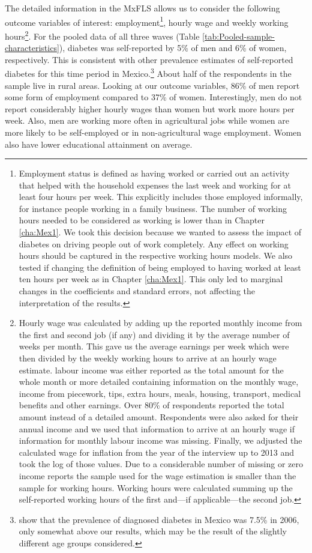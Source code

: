 The detailed information in the \ac{MxFLS} allows us to consider the following outcome variables of interest: employment\footnote{Employment status is defined as having worked or carried out an activity that helped with the household expenses the last week and working for at least four hours per week. This explicitly includes those employed informally, for instance people working in a family business. The number of working hours needed to be considered as working is lower than in Chapter \ref{cha:Mex1}. We took this decision because we wanted to assess the impact of diabetes on driving people out of work completely. Any effect on working hours should be captured in the respective working hours models. We also tested if changing the definition of being employed to having worked at least ten hours per week as in Chapter \ref{cha:Mex1}. This only led to marginal changes in the coefficients and standard errors, not affecting the interpretation of the results.}, hourly wage and weekly working hours\footnote{Hourly wage was calculated by adding up the reported monthly income from the first and second job (if any) and dividing it by the average number of weeks per month. This gave us the average earnings per week which were then divided by the weekly working hours to arrive at an hourly wage estimate. labour income was either reported as the total amount for the whole month or more detailed containing information on the monthly wage, income from piecework, tips, extra hours, meals, housing, transport, medical benefits and other earnings. Over 80\% of respondents reported the total amount instead of a detailed amount. Respondents were also asked for their annual income and we used that information to arrive at an hourly wage if information for monthly labour income was missing. Finally, we adjusted the calculated wage for inflation from the year of the interview up to 2013 and took the log of those values. Due to a considerable number of missing or zero income reports the sample used for the wage estimation is smaller than the sample for working hours. Working hours were calculated summing up the self-reported working hours of the first and---if applicable---the second job.}. For the pooled data of all three waves (Table  \ref{tab:Pooled-sample-characteristics}), diabetes was self-reported by 5\% of men and 6\% of women, respectively. This is consistent with other prevalence estimates of self-reported diabetes for this time period in Mexico.\footnote{\textcite{Barquera2013} show that the prevalence of diagnosed diabetes in Mexico was 7.5\% in 2006, only somewhat above our results, which may be the result of the slightly different age groups considered.}  About half of the respondents in the sample live in rural areas. Looking at our outcome variables, 86\% of men report some form of employment compared to 37\% of women. Interestingly, men do not report considerably higher hourly wages than women but work more hours per week. Also, men are working more often in agricultural jobs while women are more likely to be self-employed or in non-agricultural wage employment. Women also have lower educational attainment on average. 

